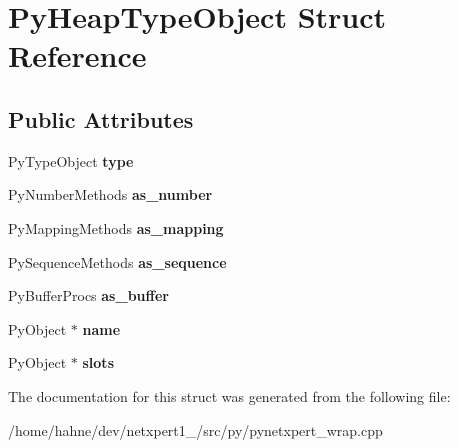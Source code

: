 \hypertarget{structPyHeapTypeObject}{}\section{Py\+Heap\+Type\+Object Struct Reference}
\label{structPyHeapTypeObject}
\subsection*{Public Attributes}
\begin{DoxyCompactItemize}
\item 
Py\+Type\+Object {\bfseries type}\hypertarget{structPyHeapTypeObject_a8b961137de4ebeed5a5d2e4b47ee1ca7}{}\label{structPyHeapTypeObject_a8b961137de4ebeed5a5d2e4b47ee1ca7}

\item 
Py\+Number\+Methods {\bfseries as\+\_\+number}\hypertarget{structPyHeapTypeObject_a795de378df40d11321c0dbe463759560}{}\label{structPyHeapTypeObject_a795de378df40d11321c0dbe463759560}

\item 
Py\+Mapping\+Methods {\bfseries as\+\_\+mapping}\hypertarget{structPyHeapTypeObject_a3112d193aea288a92036360bec1ce0a5}{}\label{structPyHeapTypeObject_a3112d193aea288a92036360bec1ce0a5}

\item 
Py\+Sequence\+Methods {\bfseries as\+\_\+sequence}\hypertarget{structPyHeapTypeObject_ad553caad5da3a7004aae1b7ac0289f12}{}\label{structPyHeapTypeObject_ad553caad5da3a7004aae1b7ac0289f12}

\item 
Py\+Buffer\+Procs {\bfseries as\+\_\+buffer}\hypertarget{structPyHeapTypeObject_a026c64b0a5163ea580e79640ecf209de}{}\label{structPyHeapTypeObject_a026c64b0a5163ea580e79640ecf209de}

\item 
Py\+Object $\ast$ {\bfseries name}\hypertarget{structPyHeapTypeObject_a5440c0413b3c519d996119695c957c80}{}\label{structPyHeapTypeObject_a5440c0413b3c519d996119695c957c80}

\item 
Py\+Object $\ast$ {\bfseries slots}\hypertarget{structPyHeapTypeObject_a15212a8f85d939b3f4b133ecda1b62e5}{}\label{structPyHeapTypeObject_a15212a8f85d939b3f4b133ecda1b62e5}

\end{DoxyCompactItemize}


The documentation for this struct was generated from the following file\+:\begin{DoxyCompactItemize}
\item 
/home/hahne/dev/netxpert1\+\_/src/py/pynetxpert\+\_\+wrap.\+cpp\end{DoxyCompactItemize}
